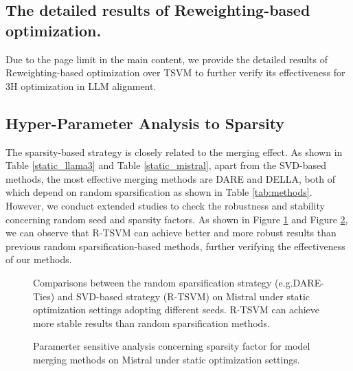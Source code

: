 \subsection{The detailed results of Reweighting-based optimization.}\label{appendix_reweighting}
Due to the page limit in the main content, we provide the detailed results of Reweighting-based optimization over TSVM to further verify its effectiveness for 3H optimization in LLM alignment.



\subsection{Hyper-Parameter Analysis to Sparsity} \label{appendix_sparsity}
The sparsity-based strategy is closely related to the merging effect. As shown in Table \ref{static_llama3} and Table \ref{static_mistral}, apart from the SVD-based methods, the most effective merging methods are DARE and DELLA, both of which depend on random sparsification as shown in Table \ref{tab:methods}. However, we conduct extended studies to check the robustness and stability concerning random seed and sparsity factors. As shown in Figure \ref{seed} and Figure \ref{sparsity_sensitivity}, we can observe that R-TSVM can achieve better and more robust results than previous random sparsification-based methods, further verifying the effectiveness of our methods.


\begin{figure}[tb]
\centering
{}
\caption{Comparisons between the random sparsification strategy (e.g.DARE-Ties) and SVD-based strategy (R-TSVM) on Mistral under static optimization settings adopting different seeds. R-TSVM can achieve more stable results than random sparsification methods. }
\label{seed}
\end{figure}

\begin{figure}[tb]
\centering
{}
\caption{Paramerter sensitive analysis concerning sparsity factor for model merging methods on Mistral under static optimization settings.}
\label{sparsity_sensitivity}
\end{figure}
